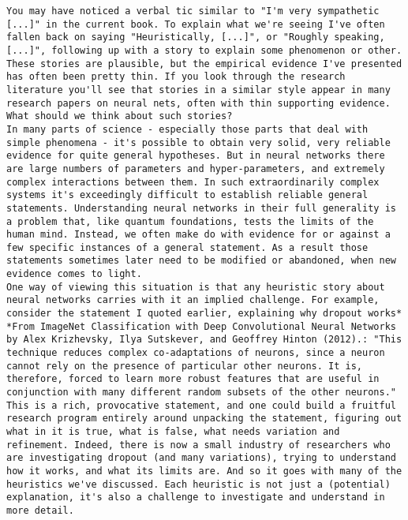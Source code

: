\begin{lstlisting}
You may have noticed a verbal tic similar to "I'm very sympathetic [...]" in the current book. To explain what we're seeing I've often fallen back on saying "Heuristically, [...]", or "Roughly speaking, [...]", following up with a story to explain some phenomenon or other. These stories are plausible, but the empirical evidence I've presented has often been pretty thin. If you look through the research literature you'll see that stories in a similar style appear in many research papers on neural nets, often with thin supporting evidence. What should we think about such stories?
In many parts of science - especially those parts that deal with simple phenomena - it's possible to obtain very solid, very reliable evidence for quite general hypotheses. But in neural networks there are large numbers of parameters and hyper-parameters, and extremely complex interactions between them. In such extraordinarily complex systems it's exceedingly difficult to establish reliable general statements. Understanding neural networks in their full generality is a problem that, like quantum foundations, tests the limits of the human mind. Instead, we often make do with evidence for or against a few specific instances of a general statement. As a result those statements sometimes later need to be modified or abandoned, when new evidence comes to light.
One way of viewing this situation is that any heuristic story about neural networks carries with it an implied challenge. For example, consider the statement I quoted earlier, explaining why dropout works* *From ImageNet Classification with Deep Convolutional Neural Networks by Alex Krizhevsky, Ilya Sutskever, and Geoffrey Hinton (2012).: "This technique reduces complex co-adaptations of neurons, since a neuron cannot rely on the presence of particular other neurons. It is, therefore, forced to learn more robust features that are useful in conjunction with many different random subsets of the other neurons." This is a rich, provocative statement, and one could build a fruitful research program entirely around unpacking the statement, figuring out what in it is true, what is false, what needs variation and refinement. Indeed, there is now a small industry of researchers who are investigating dropout (and many variations), trying to understand how it works, and what its limits are. And so it goes with many of the heuristics we've discussed. Each heuristic is not just a (potential) explanation, it's also a challenge to investigate and understand in more detail.

\end{lstlisting}
